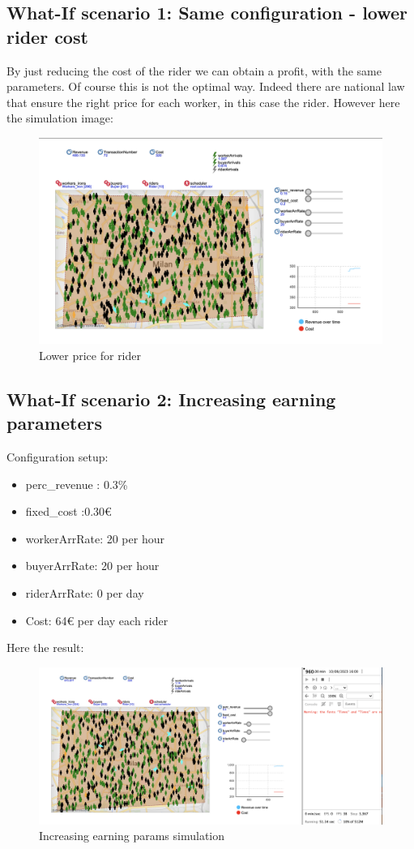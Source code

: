 \subsection{What-If scenario 1: Same configuration - lower rider cost}
By just reducing the cost of the rider we can obtain a profit, with the same parameters. Of course this is not the optimal way. Indeed there are national law that ensure the right price for each worker, in this case the rider. However here the simulation image:
\begin{figure}[hbtp]
 \caption{Lower price for rider}
 \centering
 \includegraphics[scale=0.3]{../Images/sim03.png}
 \end{figure}
\subsection{What-If scenario 2: Increasing earning parameters}
Configuration setup:
\begin{itemize}
\item perc\_revenue : 0.3\%
\item fixed\_cost :0.30€
\item workerArrRate: 20 per hour
\item buyerArrRate: 20 per hour
\item riderArrRate: 0 per day
\item Cost: 64€ per day each rider
\end{itemize}
Here the result:
\begin{figure}[hbtp]
\caption{Increasing earning params simulation}
\centering
\includegraphics[scale=0.3]{../Images/sim04.png}
\end{figure}
